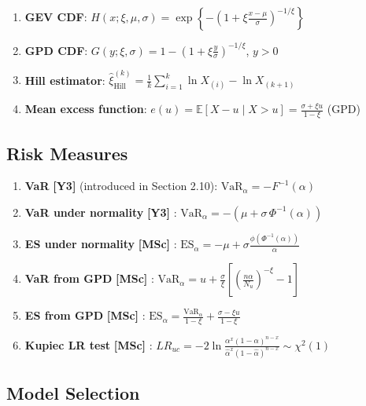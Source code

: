 \documentclass[11pt, a4paper]{article}
\newcommand{\E}{\mathbb{E}}
\newcommand{\layerY}[1]{\textcolor{MainBlue}{\textbf{[Y3]}} #1}
\newcommand{\layerM}[1]{\textcolor{Forest}{\textbf{[MSc]}} #1}
\theoremstyle{definition}
\begin{document}
\begin{enumerate}[resume]
  \item \textbf{GEV CDF}: $H(x;\xi,\mu,\sigma) = \exp\!\left\{-\left(1 + \xi\frac{x-\mu}{\sigma}\right)^{-1/\xi}\right\}$

  \item \textbf{GPD CDF}: $G(y;\xi,\sigma) = 1 - \left(1 + \xi\frac{y}{\sigma}\right)^{-1/\xi}$, \quad $y > 0$

  \item \textbf{Hill estimator}: $\hat{\xi}_{\text{Hill}}^{(k)} = \frac{1}{k}\sum_{i=1}^{k}\ln X_{(i)} - \ln X_{(k+1)}$

  \item \textbf{Mean excess function}: $e(u) = \E[X - u \mid X > u] = \frac{\sigma + \xi u}{1 - \xi}$ (GPD)
\end{enumerate}

\subsection{Risk Measures}

\begin{enumerate}[resume]
  \item \textbf{VaR} \layerY{(introduced in Section 2.10)}: $\text{VaR}_\alpha = -F^{-1}(\alpha)$

  \item \textbf{VaR under normality} \layerY{}: $\text{VaR}_\alpha = -(\mu + \sigma\,\Phi^{-1}(\alpha))$

  \item \textbf{ES under normality} \layerM{}: $\text{ES}_\alpha = -\mu + \sigma\frac{\phi(\Phi^{-1}(\alpha))}{\alpha}$

  \item \textbf{VaR from GPD} \layerM{}: $\text{VaR}_\alpha = u + \frac{\sigma}{\xi}\left[\left(\frac{n\alpha}{N_u}\right)^{-\xi} - 1\right]$

  \item \textbf{ES from GPD} \layerM{}: $\text{ES}_\alpha = \frac{\text{VaR}_\alpha}{1-\xi} + \frac{\sigma - \xi u}{1-\xi}$

  \item \textbf{Kupiec LR test} \layerM{}: $LR_{uc} = -2\ln\frac{\alpha^x(1-\alpha)^{n-x}}{\hat{\alpha}^x(1-\hat{\alpha})^{n-x}} \sim \chi^2(1)$
\end{enumerate}

\subsection{Model Selection}
\end{document}
